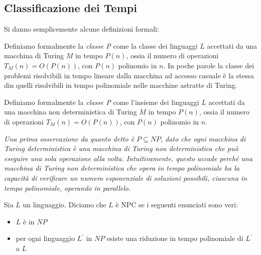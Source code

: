 \documentclass[a4paper,12pt, oneside]{book}
\begin{document}
\subsection{Classificazione dei Tempi}
Si danno semplicemente alcune definizioni formali:
\begin{definizione}
  Definiamo formalmente la \textit{classe P} come la classe dei
  linguaggi $L$ accettati da una macchina di Turing $M$ in tempo
  $P(n)$, ossia il numero di operazioni $T_M (n) = O(P(n))$, con
  $P(n)$ polinomio in $n$. In poche parole la classe dei problemi
  risolvibili in tempo lineare dalla macchina ad accesso casuale è la
  stessa din quelli risolvibili in tempo polinomiale nelle macchine
  astratte di Turing.
\end{definizione}
\begin{definizione}
  Definiamo formalmente la \textit{classe P} come l’insieme dei
  linguaggi $L$ accettati da una macchina non deterministica di Turing
  $M$ in tempo $P(n)$, ossia il numero di operazioni $T_M (n) =
  O(P(n))$, con $P(n)$ polinomio in $n$.
\end{definizione}
\textit{Una prima osservazione da quanto detto è $P\subseteq NP$, dato
  che ogni macchina di Turing deterministica è una macchina di Turing
  non deterministica che può eseguire una sola operazione alla
  volta. Intuitivamente, questo accade perché una macchina di Turing
  non deterministica che opera in tempo polinomiale ha la capacità di
  verificare un numero esponenziale di soluzioni possibili, ciascuna
  in tempo polinomiale, operando in parallelo.}
\begin{definizione}
  Sia $L$ un linguaggio. Diciamo che $L$ è NPC se i seguenti enunciati
  sono veri:
  \begin{itemize}
    \item $L$ è in $NP$
    \item per ogni linguaggio $L^{'}$ in $NP$ esiste una riduzione in
    tempo polinomiale di $L^{'}$ a $L$
  \end{itemize}
\end{definizione}
\end{document}
